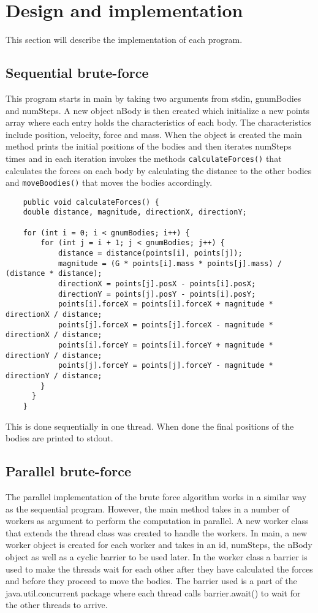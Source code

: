 \documentclass{article}
\begin{document}
\section{Design and implementation}

This section will describe the implementation of each program.

\subsection{Sequential brute-force}

This program starts in main by taking two arguments from stdin, gnumBodies and numSteps. A new object nBody is then created which initialize a new points array where each entry holds the characteristics of each body. The characteristics include position, velocity, force and mass. When the object is created the main method prints the initial positions of the bodies and then iterates numSteps times and in each iteration invokes the methods \texttt{calculateForces()} that calculates the forces on each body by calculating the distance to the other bodies and \texttt{moveBoodies()} that moves the bodies accordingly. 

\begin{verbatim}
    public void calculateForces() {
    double distance, magnitude, directionX, directionY;

    for (int i = 0; i < gnumBodies; i++) {
        for (int j = i + 1; j < gnumBodies; j++) {
            distance = distance(points[i], points[j]);
            magnitude = (G * points[i].mass * points[j].mass) / (distance * distance);
            directionX = points[j].posX - points[i].posX;
            directionY = points[j].posY - points[i].posY;
            points[i].forceX = points[i].forceX + magnitude * directionX / distance;
            points[j].forceX = points[j].forceX - magnitude * directionX / distance;
            points[i].forceY = points[i].forceY + magnitude * directionY / distance;
            points[j].forceY = points[j].forceY - magnitude * directionY / distance;
        }
      }
    }
\end{verbatim}
This is done sequentially in one thread. When done the final positions of the bodies are printed to stdout. 

\subsection{Parallel brute-force}

The parallel implementation of the brute force algorithm works in a similar way as the sequential program. However, the main method takes in a number of workers as argument to perform the computation in parallel. A new worker class that extends the thread class was created to handle the workers. In main, a new worker object is created for each worker and takes in an id, numSteps, the nBody object as well as a cyclic barrier to be used later. In the worker class a barrier is used to make the threads wait for each other after they have calculated the forces and before they proceed to move the bodies. The barrier used is a part of the java.util.concurrent package where each thread calls barrier.await() to wait for the other threads to arrive. 
\end{document}
